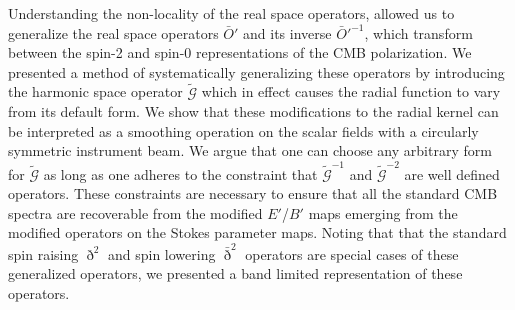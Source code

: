  

Understanding the non-locality of the real space operators, allowed us to generalize the real space operators $\bar{O}'$ and its inverse ${\bar O}'^{-1}$, which transform between the spin-2 and spin-0 representations of the CMB polarization. We presented a method of systematically generalizing these operators by introducing the harmonic space operator $\tilde{\mathcal{G}}$ which in effect causes the radial function to vary from its default form. We show that these modifications to the radial kernel can be interpreted as a smoothing operation on the scalar fields with a circularly symmetric instrument beam. We argue that one can choose any arbitrary form for $\tilde{\mathcal{G}}$ as long as one adheres to the constraint that $\tilde{\mathcal{G}}^{-1}$ and $\tilde{\mathcal{G}}^{-2}$ are well defined operators.  These constraints are necessary to ensure that all the standard CMB spectra are recoverable from the modified $E'$/$B'$ maps emerging from the modified operators on the Stokes parameter maps. Noting that that the standard spin raising $\eth^2$ and spin lowering $\bar{\eth}^2$ operators are special cases of these generalized operators, we presented a band limited representation of these operators. 



